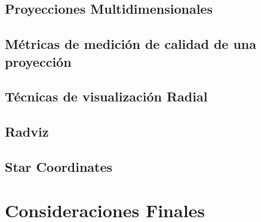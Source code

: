 		\subsection{Proyecciones Multidimensionales}
		\subsection{Métricas de medición de calidad de una proyección}
		\subsection{Técnicas de visualización Radial}
		\subsection{Radviz}
		\subsection{Star Coordinates}
\section{Consideraciones Finales}
